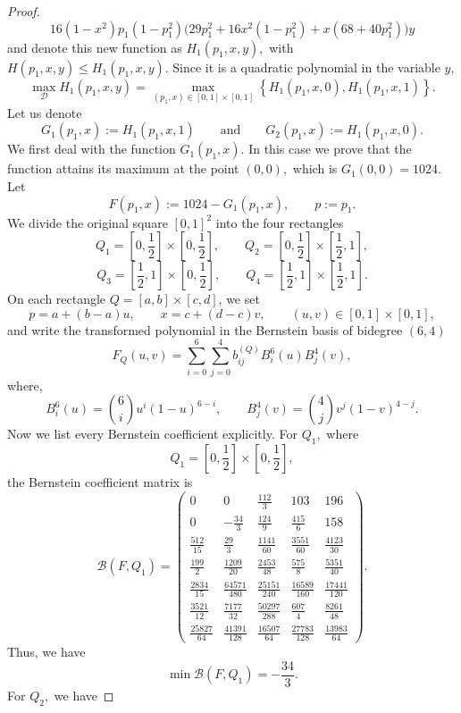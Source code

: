 \documentclass[10pt,a4paper]{amsart}
\begin{document}
\begin{proof}
\[
16(1-x^2)p_1(1-p_1^2)\bigl(29p_1^2+16x^2(1-p_1^2)+x(68+40p_1^2)\bigr)y
\]
and denote this new function as $H_{1}(p_1, x, y),$ with $H(p_1, x, y)\le H_{1}(p_1, x, y).$ Since it is a quadratic polynomial in the variable $y,$ 
\[
\max_{\mathcal{D}}H_{1}(p_1, x, y)=\max_{(p_{1},x)\in [0, 1]\times[0, 1]}\left\{H_{1}(p_1, x, 0), H_{1}(p_1, x, 1)\right\}.
\]
Let us denote
\[
G_{1}(p_1, x):= H_{1}(p_1, x, 1)
\qquad\text{and}\qquad
G_{2}(p_1, x):= H_{1}(p_1, x, 0).
\]
We first deal with the function $G_{1}(p_1, x).$ In this case we prove that the function attains its maximum at the point $(0, 0),$ which is $G_{1}(0, 0)=1024$.\\[2mm]
Let
\[
F(p_1,x):=1024-G_1(p_1,x),
\qquad p:=p_1.
\]
We divide the original square \([0,1]^2\) into the four rectangles
\[
Q_1=\left[0,\frac12\right]\times\left[0,\frac12\right],\qquad
Q_2=\left[0,\frac12\right]\times\left[\frac12,1\right],
\]
\[
Q_3=\left[\frac12,1\right]\times\left[0,\frac12\right],\qquad
Q_4=\left[\frac12,1\right]\times\left[\frac12,1\right].
\]
On each rectangle \(Q=[a,b]\times[c,d]\), we set
\[
p=a+(b-a)u,\qquad x=c+(d-c)v,\qquad (u,v)\in[0,1]\times[0, 1],
\]
and write the transformed polynomial in the Bernstein basis of bidegree $(6,4)$
\[
F_Q(u,v)=\sum_{i=0}^{6}\sum_{j=0}^{4} b^{(Q)}_{ij} B_i^6(u)B_j^4(v),
\]
where,
\[
B_i^6(u)=\binom{6}{i}u^i(1-u)^{6-i},
\qquad
B_j^4(v)=\binom{4}{j}v^j(1-v)^{4-j}.
\]
Now we list every Bernstein coefficient explicitly.
For $Q_{1},$ where
\[
Q_1=\left[0,\frac12\right]\times\left[0,\frac12\right],
\]
the Bernstein coefficient matrix is
\[
\mathcal B(F,Q_1)=
\begin{pmatrix}
	0 & 0 & \frac{112}{3} & 103 & 196\\[5mm]
	0 & -\frac{34}{3} & \frac{124}{9} & \frac{415}{6} & 158\\[5mm]
	\frac{512}{15} & \frac{29}{3} & \frac{1141}{60} & \frac{3551}{60} & \frac{4123}{30}\\[5mm]
	\frac{199}{2} & \frac{1209}{20} & \frac{2453}{48} & \frac{575}{8} & \frac{5351}{40}\\[5mm]
	\frac{2834}{15} & \frac{64571}{480} & \frac{25151}{240} & \frac{16589}{160} & \frac{17441}{120}\\[5mm]
	\frac{3521}{12} & \frac{7177}{32} & \frac{50297}{288} & \frac{607}{4} & \frac{8261}{48}\\[5mm]
	\frac{25827}{64} & \frac{41391}{128} & \frac{16507}{64} & \frac{27783}{128} & \frac{13983}{64}
\end{pmatrix}.
\]
Thus, we have 
\[
\min \mathcal B(F,Q_1)=-\frac{34}{3}.
\]
For $Q_{2},$ we have

\end{proof}
\end{document}
